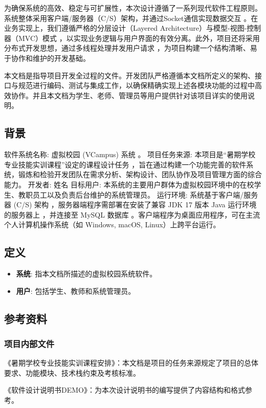 \documentclass[a4paper]{ctexart}
\begin{document}
为确保系统的高效、稳定与可扩展性，本次设计遵循了一系列现代软件工程原则。系统整体采用客户端/服务器（C/S）架构，并通过Socket通信实现数据交互 。在业务实现上，我们遵循严格的分层设计（Layered Architecture）与模型-视图-控制器（MVC）模式 ，以实现业务逻辑与用户界面的有效分离。此外，项目还将采用分布式开发思想，通过多线程处理并发用户请求 ，为项目构建一个结构清晰、易于协作和维护的开发基础。

本文档是指导项目开发全过程的文件。开发团队严格遵循本文档所定义的架构、接口与规范进行编码、测试与集成工作，以确保精确实现上述各模块功能的过程中高效协作。并且本文档为学生、老师、管理员等用户提供针对该项目详实的使用说明。

\subsection{背景}
软件系统名称: 虚拟校园 (VCampus) 系统 。
项目任务来源: 本项目是“暑期学校专业技能实训课程”设定的课程设计任务 ，旨在通过构建一个功能完善的软件系统，锻炼和检验开发团队在需求分析、架构设计、团队协作及项目管理方面的综合能力。
开发者: 姓名
目标用户: 本系统的主要用户群体为虚拟校园环境中的在校学生、教职员工以及负责后台维护的系统管理员。
运行环境: 系统基于客户端/服务器 (C/S) 架构 ，服务器端程序需部署在安装了兼容 JDK 17 版本 Java 运行环境的服务器上 ，并连接至 MySQL 数据库 。客户端程序为桌面应用程序，可在主流个人计算机操作系统（如 Windows, macOS, Linux）上跨平台运行。

\subsection{定义}
\begin{itemize}
    \item \textbf{系统}: 指本文档所描述的虚拟校园系统软件。
    \item \textbf{用户}: 包括学生、教师和系统管理员。
\end{itemize}

\subsection{参考资料}
\subsubsection{项目内部文件}

《暑期学校专业技能实训课程安排》：本文档是项目的任务来源规定了项目的总体要求、功能模块、技术栈约束及考核标准。

《软件设计说明书DEMO》：为本次设计说明书的编写提供了内容结构和格式参考。
\end{document}
